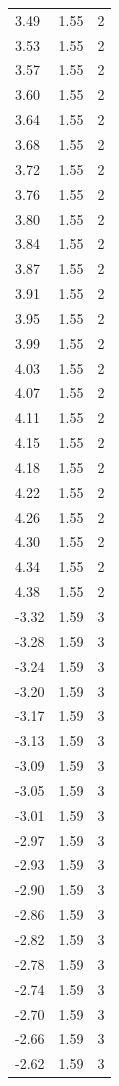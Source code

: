 \begin{longtable}{lrr}
  3.49 & 1.55 & 2 \\
  3.53 & 1.55 & 2 \\
  3.57 & 1.55 & 2 \\
  3.60 & 1.55 & 2 \\
  3.64 & 1.55 & 2 \\
  3.68 & 1.55 & 2 \\
  3.72 & 1.55 & 2 \\
  3.76 & 1.55 & 2 \\
  3.80 & 1.55 & 2 \\
  3.84 & 1.55 & 2 \\
  3.87 & 1.55 & 2 \\
  3.91 & 1.55 & 2 \\
  3.95 & 1.55 & 2 \\
  3.99 & 1.55 & 2 \\
  4.03 & 1.55 & 2 \\
  4.07 & 1.55 & 2 \\
  4.11 & 1.55 & 2 \\
  4.15 & 1.55 & 2 \\
  4.18 & 1.55 & 2 \\
  4.22 & 1.55 & 2 \\
  4.26 & 1.55 & 2 \\
  4.30 & 1.55 & 2 \\
  4.34 & 1.55 & 2 \\
  4.38 & 1.55 & 2 \\
  -3.32 & 1.59 & 3 \\
  -3.28 & 1.59 & 3 \\
  -3.24 & 1.59 & 3 \\
  -3.20 & 1.59 & 3 \\
  -3.17 & 1.59 & 3 \\
  -3.13 & 1.59 & 3 \\
  -3.09 & 1.59 & 3 \\
  -3.05 & 1.59 & 3 \\
  -3.01 & 1.59 & 3 \\
  -2.97 & 1.59 & 3 \\
  -2.93 & 1.59 & 3 \\
  -2.90 & 1.59 & 3 \\
  -2.86 & 1.59 & 3 \\
  -2.82 & 1.59 & 3 \\
  -2.78 & 1.59 & 3 \\
  -2.74 & 1.59 & 3 \\
  -2.70 & 1.59 & 3 \\
  -2.66 & 1.59 & 3 \\
  -2.62 & 1.59 & 3 \\

\end{longtable}

